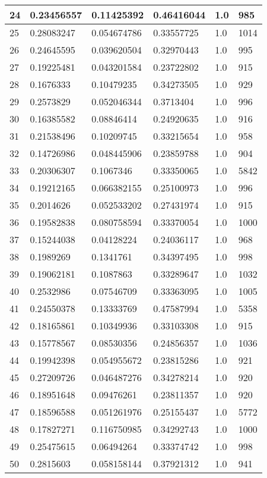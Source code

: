 \begin{longtable}{|l|l|l|l|l|l|}
24 & 0.23456557 & 0.11425392 & 0.46416044 & 1.0 & 985 \\ \hline 
25 & 0.28083247 & 0.054674786 & 0.33557725 & 1.0 & 1014 \\ \hline 
26 & 0.24645595 & 0.039620504 & 0.32970443 & 1.0 & 995 \\ \hline 
27 & 0.19225481 & 0.043201584 & 0.23722802 & 1.0 & 915 \\ \hline 
28 & 0.1676333 & 0.10479235 & 0.34273505 & 1.0 & 929 \\ \hline 
29 & 0.2573829 & 0.052046344 & 0.3713404 & 1.0 & 996 \\ \hline 
30 & 0.16385582 & 0.08846414 & 0.24920635 & 1.0 & 916 \\ \hline 
31 & 0.21538496 & 0.10209745 & 0.33215654 & 1.0 & 958 \\ \hline 
32 & 0.14726986 & 0.048445906 & 0.23859788 & 1.0 & 904 \\ \hline 
33 & 0.20306307 & 0.1067346 & 0.33350065 & 1.0 & 5842 \\ \hline 
34 & 0.19212165 & 0.066382155 & 0.25100973 & 1.0 & 996 \\ \hline 
35 & 0.2014626 & 0.052533202 & 0.27431974 & 1.0 & 915 \\ \hline 
36 & 0.19582838 & 0.080758594 & 0.33370054 & 1.0 & 1000 \\ \hline 
37 & 0.15244038 & 0.04128224 & 0.24036117 & 1.0 & 968 \\ \hline 
38 & 0.1989269 & 0.1341761 & 0.34397495 & 1.0 & 998 \\ \hline 
39 & 0.19062181 & 0.1087863 & 0.33289647 & 1.0 & 1032 \\ \hline 
40 & 0.2532986 & 0.07546709 & 0.33363095 & 1.0 & 1005 \\ \hline 
41 & 0.24550378 & 0.13333769 & 0.47587994 & 1.0 & 5358 \\ \hline 
42 & 0.18165861 & 0.10349936 & 0.33103308 & 1.0 & 915 \\ \hline 
43 & 0.15778567 & 0.08530356 & 0.24856357 & 1.0 & 1036 \\ \hline 
44 & 0.19942398 & 0.054955672 & 0.23815286 & 1.0 & 921 \\ \hline 
45 & 0.27209726 & 0.046487276 & 0.34278214 & 1.0 & 920 \\ \hline 
46 & 0.18951648 & 0.09476261 & 0.23811357 & 1.0 & 920 \\ \hline 
47 & 0.18596588 & 0.051261976 & 0.25155437 & 1.0 & 5772 \\ \hline 
48 & 0.17827271 & 0.116750985 & 0.34292743 & 1.0 & 1000 \\ \hline 
49 & 0.25475615 & 0.06494264 & 0.33374742 & 1.0 & 998 \\ \hline 
50 & 0.2815603 & 0.058158144 & 0.37921312 & 1.0 & 941 \\ \hline 
\end{longtable}